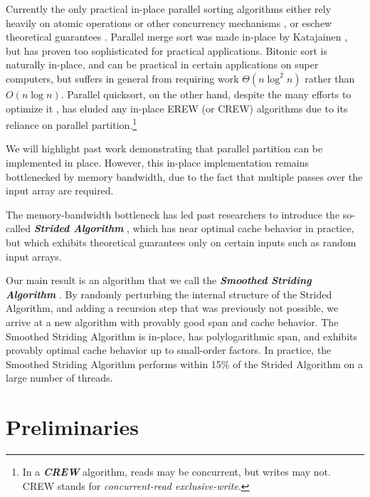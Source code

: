\documentclass[11pt]{article}
\newcommand{\defn}[1]{{\textit{\textbf{\boldmath #1}}} }
\renewcommand{\paragraph}[1]{\vspace{0.09in}\noindent{\bf \boldmath #1.}}
\theoremstyle{remark}
\theoremstyle{remark}
\begin{document}
Currently the only practical in-place parallel sorting algorithms
either rely heavily on atomic operations or other concurrency
mechanisms \cite{HeidelbergerNo90, AxtmannWi17, TsigasZh03}, or eschew
theoretical guarantees \cite{FrancisPa92}. Parallel merge sort
\cite{Hagerup89} was made in-place by Katajainen \cite{Katajainen93},
but has proven too sophisticated for practical applications. Bitonic
sort \cite{BlellochLe98} is naturally in-place, and can be practical
in certain applications on super computers, but suffers in general
from requiring work $\Theta(n \log^2 n)$ rather than $O(n \log
n)$. Parallel quicksort, on the other hand, despite the many efforts
to optimize it \cite{HeidelbergerNo90, AxtmannWi17, TsigasZh03,
  FrancisPa92, Frias08}, has eluded any in-place EREW (or CREW)
algorithms due to its reliance on parallel partition.\footnote{In a \defn{CREW}
algorithm, reads may be concurrent, but writes may not. CREW stands for
\emph{concurrent-read exclusive-write}.}

\paragraph{Results}
We will highlight past work demonstrating that parallel partition can be
implemented in place. However, this in-place implementation remains
bottlenecked by memory bandwidth, due to the fact that multiple passes over the
input array are required. 

The memory-bandwidth bottleneck has led past researchers \cite{FrancisPa92,
Frias08} to introduce the so-called \defn{Strided Algorithm}, which has near
optimal cache behavior in practice, but which exhibits theoretical guarantees
only on certain inputs such as random input arrays.

Our main result is an algorithm that we call the \defn{Smoothed Striding
Algorithm}. By randomly perturbing the internal structure of the Strided
Algorithm, and adding a recursion step that was previously not possible, we
arrive at a new algorithm with provably good span and cache behavior. The
Smoothed Striding Algorithm is in-place, has polylogarithmic span, and exhibits
provably optimal cache behavior up to small-order factors. In practice, the
Smoothed Striding Algorithm performs within 15\% of the Strided Algorithm on a
large number of threads.



\section{Preliminaries}\label{secprelim}
\end{document}
